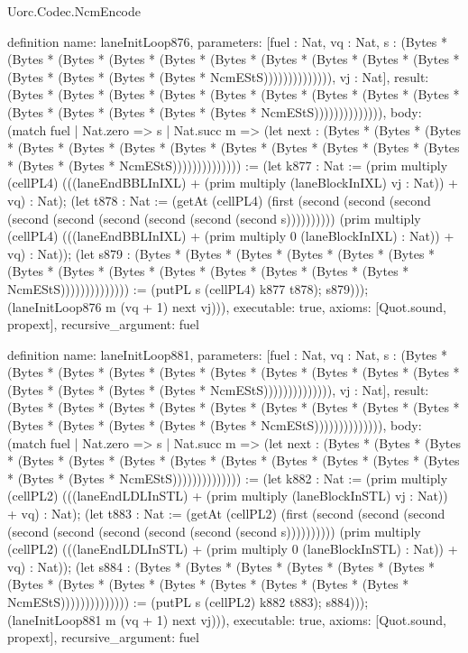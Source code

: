 \begin{lexlean}{Uorc.Codec.NcmEncode}
\begin{semanticmodule}
definition{
  name: laneInitLoop876,
  parameters: [fuel : Nat, vq : Nat, s : (Bytes * (Bytes * (Bytes * (Bytes * (Bytes * (Bytes * (Bytes * (Bytes * (Bytes * (Bytes * (Bytes * (Bytes * (Bytes * (Bytes * NcmEStS)))))))))))))), vj : Nat],
  result: (Bytes * (Bytes * (Bytes * (Bytes * (Bytes * (Bytes * (Bytes * (Bytes * (Bytes * (Bytes * (Bytes * (Bytes * (Bytes * (Bytes * NcmEStS)))))))))))))),
  body: (match fuel
    | Nat.zero => s
    | Nat.succ m => (let next : (Bytes * (Bytes * (Bytes * (Bytes * (Bytes * (Bytes * (Bytes * (Bytes * (Bytes * (Bytes * (Bytes * (Bytes * (Bytes * (Bytes * NcmEStS)))))))))))))) := (let k877 : Nat := (prim multiply (cellPL4) (((laneEndBBLInIXL) + (prim multiply (laneBlockInIXL) vj : Nat)) + vq) : Nat); (let t878 : Nat := (getAt (cellPL4) (first (second (second (second (second (second (second (second (second (second s)))))))))) (prim multiply (cellPL4) (((laneEndBBLInIXL) + (prim multiply 0 (laneBlockInIXL) : Nat)) + vq) : Nat)); (let s879 : (Bytes * (Bytes * (Bytes * (Bytes * (Bytes * (Bytes * (Bytes * (Bytes * (Bytes * (Bytes * (Bytes * (Bytes * (Bytes * (Bytes * NcmEStS)))))))))))))) := (putPL s (cellPL4) k877 t878); s879))); (laneInitLoop876 m (vq + 1) next vj))),
  executable: true,
  axioms: [Quot.sound, propext],
  recursive_argument: fuel
}

definition{
  name: laneInitLoop881,
  parameters: [fuel : Nat, vq : Nat, s : (Bytes * (Bytes * (Bytes * (Bytes * (Bytes * (Bytes * (Bytes * (Bytes * (Bytes * (Bytes * (Bytes * (Bytes * (Bytes * (Bytes * NcmEStS)))))))))))))), vj : Nat],
  result: (Bytes * (Bytes * (Bytes * (Bytes * (Bytes * (Bytes * (Bytes * (Bytes * (Bytes * (Bytes * (Bytes * (Bytes * (Bytes * (Bytes * NcmEStS)))))))))))))),
  body: (match fuel
    | Nat.zero => s
    | Nat.succ m => (let next : (Bytes * (Bytes * (Bytes * (Bytes * (Bytes * (Bytes * (Bytes * (Bytes * (Bytes * (Bytes * (Bytes * (Bytes * (Bytes * (Bytes * NcmEStS)))))))))))))) := (let k882 : Nat := (prim multiply (cellPL2) (((laneEndLDLInSTL) + (prim multiply (laneBlockInSTL) vj : Nat)) + vq) : Nat); (let t883 : Nat := (getAt (cellPL2) (first (second (second (second (second (second (second (second (second (second s)))))))))) (prim multiply (cellPL2) (((laneEndLDLInSTL) + (prim multiply 0 (laneBlockInSTL) : Nat)) + vq) : Nat)); (let s884 : (Bytes * (Bytes * (Bytes * (Bytes * (Bytes * (Bytes * (Bytes * (Bytes * (Bytes * (Bytes * (Bytes * (Bytes * (Bytes * (Bytes * NcmEStS)))))))))))))) := (putPL s (cellPL2) k882 t883); s884))); (laneInitLoop881 m (vq + 1) next vj))),
  executable: true,
  axioms: [Quot.sound, propext],
  recursive_argument: fuel
}


\end{semanticmodule}
\end{lexlean}
